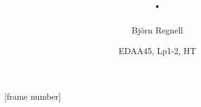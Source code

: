 [frame number]



\title[Föreläsningar EDAA45 Programmering, grundkurs (pgk),  \CurrentYear]{\vecka. \veckotema}
\author{Björn Regnell}
\date{EDAA45, Lp1-2, HT \CurrentYear}


